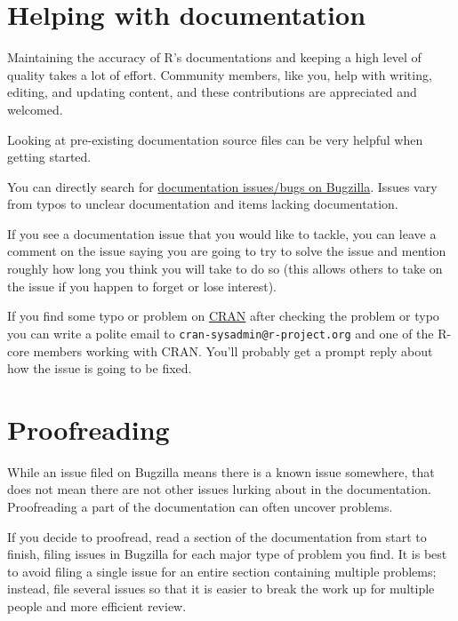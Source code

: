 \documentclass[
]{book}
\begin{document}
\hypertarget{helping-with-documentation}{%
\section{Helping with documentation}\label{helping-with-documentation}}

Maintaining the accuracy of R's documentations and keeping a high level of quality takes a lot of effort. Community members, like you, help with writing, editing, and updating content, and these contributions are appreciated and welcomed.

Looking at pre-existing documentation source files can be very helpful when getting started.

You can directly search for \href{https://bugs.r-project.org/buglist.cgi?component=Documentation\&list_id=22501\&product=R\&resolution=---}{documentation issues/bugs on Bugzilla}. Issues vary from typos to unclear documentation and items lacking documentation.

If you see a documentation issue that you would like to tackle, you can leave a comment on the issue saying you are going to try to solve the issue and mention roughly how long you think you will take to do so (this allows others to take on the issue if you happen to forget or lose interest).

If you find some typo or problem on \href{https://cran.r-project.org}{CRAN} after checking the problem or typo you can write a polite email to \texttt{cran-sysadmin@r-project.org} and one of the R-core members working with CRAN. You'll probably get a prompt reply about how the issue is going to be fixed.

\hypertarget{proofreading}{%
\section{Proofreading}\label{proofreading}}

While an issue filed on Bugzilla means there is a known issue somewhere, that does not mean there are not other issues lurking about in the documentation. Proofreading a part of the documentation can often uncover problems.

If you decide to proofread, read a section of the documentation from start to finish, filing issues in Bugzilla for each major type of problem you find. It is best to avoid filing a single issue for an entire section containing multiple problems; instead, file several issues so that it is easier to break the work up for multiple people and more efficient review.
\end{document}
